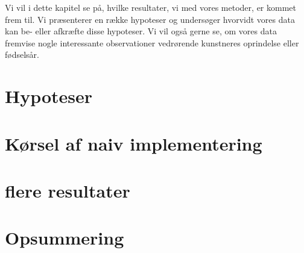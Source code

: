 {
{\sffamily Vi vil i dette kapitel se på, hvilke resultater, vi med vores
metoder, er kommet frem til. Vi præsenterer en række hypoteser og
undersøger hvorvidt vores data kan be- eller afkræfte disse hypoteser.
Vi vil også gerne se, om vores data fremvise nogle interessante
observationer vedrørende kunstneres oprindelse eller fødselsår.
}

\section{Hypoteser}


\section{Kørsel af naiv implementering\label{section_naiv_koersel}}

\clearpage

\section{flere resultater}


\section*{Opsummering}

}
